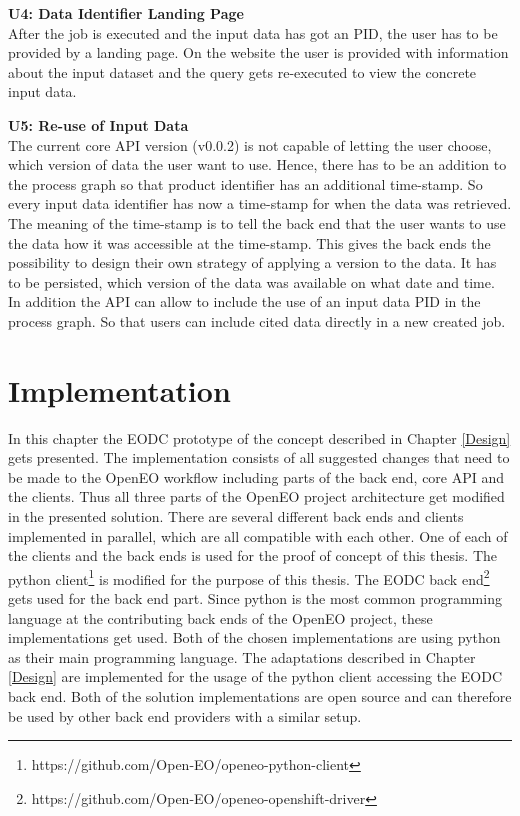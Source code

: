 \documentclass[draft,final]{vutinfth} %
\begin{document}
\textbf{U4: Data Identifier Landing Page} \\
After the job is executed and the input data has got an PID, the user has to be provided by a landing page. On the website the user is provided with information about the input dataset and the query gets re-executed to view the concrete input data.
    
\textbf{U5: Re-use of Input Data} \\
The current core API version (v0.0.2) is not capable of letting the user choose, which version of data the user want to use. Hence, there has to be an addition to the process graph so that product identifier has an additional time-stamp. So every input data identifier has now a time-stamp for when the data was retrieved. The meaning of the time-stamp is to tell the back end that the user wants to use the data how it was accessible at the time-stamp. This gives the back ends the possibility to design their own strategy of applying a version to the data. It has to be persisted, which version of the data was available on what date and time. In addition the API can allow to include the use of an input data PID in the process graph. So that users can include cited data directly in a new created job.  

\chapter{Implementation}\label{Implementation}
In this chapter the EODC prototype of the concept described in Chapter \ref{Design} gets presented. The implementation consists of all suggested changes that need to be made to the OpenEO workflow including parts of the back end, core API and the clients. Thus all three parts of the OpenEO project architecture get modified in the presented solution. There are several different back ends and clients implemented in parallel, which are all compatible with each other. One of each of the clients and the back ends is used for the proof of concept of this thesis. The python client\footnote{https://github.com/Open-EO/openeo-python-client} is modified for the purpose of this thesis. The EODC back end\footnote{https://github.com/Open-EO/openeo-openshift-driver} gets used for the back end part. Since python is the most common programming language at the contributing back ends of the OpenEO project, these implementations get used. Both of the chosen implementations are using python as their main programming language. The adaptations described in Chapter \ref{Design} are implemented for the usage of the python client accessing the EODC back end. Both of the solution implementations are open source and can therefore be used by other back end providers with a similar setup.  
\end{document}
